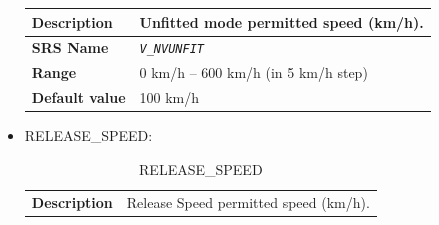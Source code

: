 \documentclass{template/openetcs}
\begin{document}
\begin{itemize}
\begin{longtable}{|l|l|}
					\begin{minipage}[t]{0.22\linewidth} \textbf{Description}	\end{minipage} 
				&	\begin{minipage}[t]{0.78\linewidth} Unfitted mode permitted speed (km/h). \end{minipage} \\
				
				\hline
				
					\begin{minipage}[t]{0.22\linewidth} \textbf{SRS Name}	\end{minipage} 
				&	\begin{minipage}[t]{0.78\linewidth} \emph{\texttt{V\_NVUNFIT}} \end{minipage} \\
				
				\hline
														
					\begin{minipage}[t]{0.22\linewidth} \textbf{Range}	\end{minipage} 
				&	\begin{minipage}[t]{0.78\linewidth} 0 km/h – 600 km/h (in 5 km/h step) \end{minipage} \\
				
				\hline
										
					\begin{minipage}[t]{0.22\linewidth} \textbf{Default value}	\end{minipage} 
				&	\begin{minipage}[t]{0.78\linewidth} 100 km/h \end{minipage} \\
				
				\hline
				
			\end{longtable}
						
			
			
		\item RELEASE\_SPEED:
		
			\begin{longtable}{|l|l|}
				\caption{RELEASE\_SPEED}\\ 												
				\hline
				
					\begin{minipage}[t]{0.22\linewidth} \textbf{Description}	\end{minipage} 
				&	\begin{minipage}[t]{0.78\linewidth} Release Speed permitted speed (km/h). \end{minipage} \\
				

\end{longtable}
\end{itemize}
\end{document}
